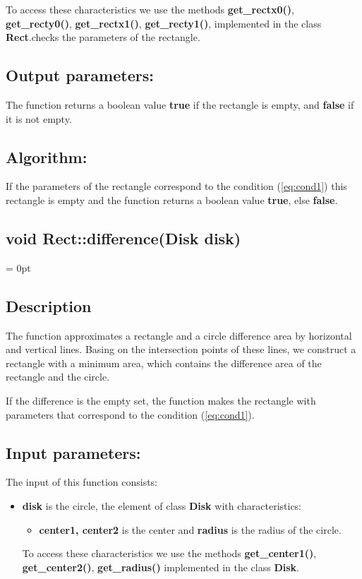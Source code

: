 \documentclass{report}
\begin{document}
To access these characteristics we use the methods  {\bfseries get\_rectx0()}, {\bfseries get\_recty0()}, {\bfseries get\_rectx1()}, {\bfseries get\_recty1()}, implemented in the class {\bfseries Rect}.checks the parameters  of the rectangle.

\subsection*{Output parameters:}

The function returns a boolean value {\bfseries true} if the rectangle is empty, and {\bfseries false} if it is not empty.

\subsection*{Algorithm:}

If the parameters of the rectangle correspond to the condition (\ref{eq:cond1}) this rectangle is empty and the function returns a boolean value {\bfseries true}, else  {\bfseries false}.

\newpage

\label{Difference}
\begin{center} 
	\section*{void Rect::difference(Disk disk)}
\end{center}
\parindent = 0pt
\subsection*{Description}

The function approximates a rectangle and a circle difference area by horizontal and vertical lines. Basing on the intersection points of these lines, we construct a rectangle with a minimum area, which contains the difference area of the rectangle and the circle.

If the difference is the empty set, the function makes the rectangle with parameters that correspond to the condition (\ref{eq:cond1}).

\subsection*{Input parameters:}

The input of this function consists:

\begin{itemize}	
	\item {\bfseries disk}  is the circle, the element of class {\bfseries Disk} with characteristics:
	\begin{itemize}
		\item {\bfseries center1, center2}  is the center and {\bfseries radius}  is  the radius of the circle.
	\end{itemize}
	
	To access these characteristics we use the methods {\bfseries get\_center1()}, {\bfseries get\_center2()}, {\bfseries get\_radius()} implemented in the class {\bfseries Disk}.
\end{itemize}
\end{document}
